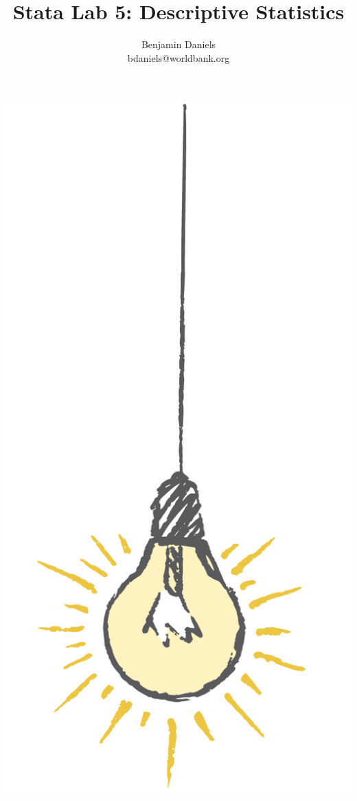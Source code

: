 \documentclass{tufte-handout}
\title{Stata Lab 5: Descriptive Statistics}
\author{Benjamin Daniels \\ bdaniels@worldbank.org}
\begin{document}
\maketitle%

\begin{marginfigure}%
  \includegraphics[width=\linewidth]{light.png}
\end{marginfigure}
\end{document}
